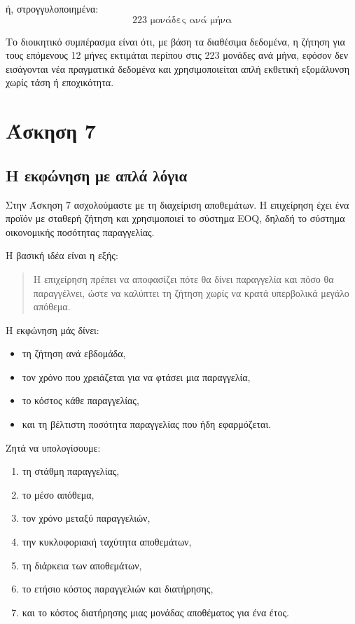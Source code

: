 \documentclass[12pt,a4paper]{article}
\begin{document}
ή, στρογγυλοποιημένα:
\[
\boxed{223 \text{ μονάδες ανά μήνα}}
\]

Το διοικητικό συμπέρασμα είναι ότι, με βάση τα διαθέσιμα δεδομένα, η ζήτηση για τους επόμενους 12 μήνες εκτιμάται περίπου στις 223 μονάδες ανά μήνα, εφόσον δεν εισάγονται νέα πραγματικά δεδομένα και χρησιμοποιείται απλή εκθετική εξομάλυνση χωρίς τάση ή εποχικότητα.

\newpage

\section{Άσκηση 7}

\subsection{Η εκφώνηση με απλά λόγια}

Στην Άσκηση 7 ασχολούμαστε με τη διαχείριση αποθεμάτων. Η επιχείρηση έχει ένα προϊόν με σταθερή ζήτηση και χρησιμοποιεί το σύστημα EOQ, δηλαδή το σύστημα οικονομικής ποσότητας παραγγελίας.

Η βασική ιδέα είναι η εξής:

\begin{quote}
Η επιχείρηση πρέπει να αποφασίζει πότε θα δίνει παραγγελία και πόσο θα παραγγέλνει, ώστε να καλύπτει τη ζήτηση χωρίς να κρατά υπερβολικά μεγάλο απόθεμα.
\end{quote}

Η εκφώνηση μάς δίνει:

\begin{itemize}
    \item τη ζήτηση ανά εβδομάδα,
    \item τον χρόνο που χρειάζεται για να φτάσει μια παραγγελία,
    \item το κόστος κάθε παραγγελίας,
    \item και τη βέλτιστη ποσότητα παραγγελίας που ήδη εφαρμόζεται.
\end{itemize}

Ζητά να υπολογίσουμε:

\begin{enumerate}
    \item τη στάθμη παραγγελίας,
    \item το μέσο απόθεμα,
    \item τον χρόνο μεταξύ παραγγελιών,
    \item την κυκλοφοριακή ταχύτητα αποθεμάτων,
    \item τη διάρκεια των αποθεμάτων,
    \item το ετήσιο κόστος παραγγελιών και διατήρησης,
    \item και το κόστος διατήρησης μιας μονάδας αποθέματος για ένα έτος.
\end{enumerate}
\end{document}
